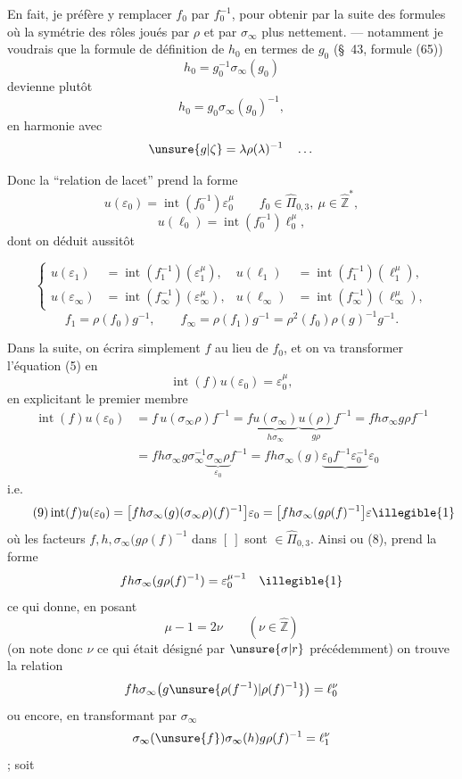 En fait, je préfère y remplacer $f_0$ par $f_0^{-1}$, pour obtenir par la suite des formules où la symétrie des rôles joués par $\rho$ et par $\sigma_\infty$  plus nettement. --- notamment je voudrais que la formule de définition de $h_0$ en termes de $g_0$ (\S\ 43, formule (65))
\[
h_0=g_0^{-1}\sigma_\infty(g_0)
\]
devienne plutôt
\[
h_0=g_0\sigma_\infty(g_0)^{-1},
\]
en harmonie avec
\[
\unsure{g|\zeta}=\lambda\rho(\lambda)^{-1}\quad\dots
\]

Donc la ``relation de lacet'' prend la forme
\[
\tag{5}
u(\varepsilon_0)=\operatorname{int}(f_0^{-1})\varepsilon_0^\mu
\qquad f_0\in\widehat{\Pi}_{0,3},\ \mu\in\widehat{\mathbb Z}^{*},
\]
\[
\tag{6}
u(\ell_0)=\operatorname{int}(f_0^{-1})\ell_0^\mu,
\]
dont on déduit aussitôt



\[
\tag{7}
\left\{
\begin{aligned}
u(\varepsilon_1)&=\operatorname{int}(f_1^{-1})(\varepsilon_1^\mu),
&u(\ell_1)&=\operatorname{int}(f_1^{-1})(\ell_1^\mu),\\
u(\varepsilon_\infty)&=\operatorname{int}(f_\infty^{-1})(\varepsilon_\infty^\mu),
&u(\ell_\infty)&=\operatorname{int}(f_\infty^{-1})(\ell_\infty^\mu),
\end{aligned}
\right.
\]
\[
\tag{8}
f_1=\rho(f_0)g^{-1},\qquad
f_\infty=\rho(f_1)g^{-1}=\rho^2(f_0)\rho(g)^{-1}g^{-1}.
\]

Dans la suite, on écrira simplement $f$ au lieu de $f_0$, et on va transformer l'équation (5)  en
\[
\tag{8bis}
\operatorname{int}(f)u(\varepsilon_0)=\varepsilon_0^\mu,
\]
en explicitant le premier membre
\[
\begin{aligned}
\operatorname{int}(f)u(\varepsilon_0)
&=f\,u(\sigma_\infty\rho)f^{-1}
=f\underbrace{u(\sigma_\infty)}_{h\sigma_\infty}\underbrace{u(\rho)}_{g\rho}f^{-1}
=fh\sigma_\infty g\rho f^{-1}\\
&=fh\sigma_\infty g\sigma_\infty^{-1}\underbrace{\sigma_\infty\rho}_{\varepsilon_0}f^{-1}
=fh\sigma_\infty(g)\underbrace{\varepsilon_0f^{-1}\varepsilon_0^{-1}}\varepsilon_0
\end{aligned}
\]
i.e.
\[
\tag{9}
\operatorname{int}(f)u(\varepsilon_0)
=\bigl[fh\sigma_\infty(g)(\sigma_\infty\rho)(f)^{-1}\bigr]\varepsilon_0
=\bigl[fh\sigma_\infty(g\rho(f)^{-1}\bigr]\varepsilon\illegible{1}
\]
où les  facteurs $f,h,\sigma_\infty(g\rho(f)^{-1}$ dans $[\ ]$ sont $\in\widehat{\Pi}_{0,3}$. Ainsi  ou (8), prend la forme
\[
fh\sigma_\infty(g\rho(f)^{-1})=\varepsilon_0^{\mu-1}\quad\illegible{1}
\]
ce qui donne, en posant
\[
\tag{10}
\mu-1=2\nu\qquad(\nu\in\widehat{\mathbb Z})
\]
(on note donc $\nu$ ce qui était désigné par $\unsure{\sigma|r}$ précédemment) on trouve la relation
\[
fh\sigma_\infty\bigl(g\unsure{\rho(f^{-1})|\rho(f)^{-1}}\bigr)=\ell_0^\nu
\]
ou encore, en transformant par $\sigma_\infty$
\[
\sigma_\infty(\unsure{f})\sigma_\infty(h)g\rho(f)^{-1}=\ell_1^\nu
\]
; soit

